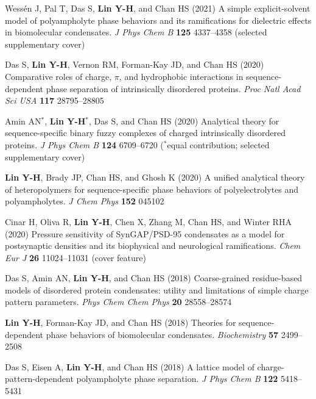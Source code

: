 \documentclass[11pt]{../yhlcv}
\def\tname#1{{\bf #1}}
\begin{document}
\begin{etaremune}[leftmargin=0.26in]

\item 
Wessén J, Pal T, Das S, \tname{Lin Y-H}, and Chan HS (2021)
A simple explicit-solvent model of polyampholyte phase behaviors and its ramifications for dielectric effects in biomolecular condensates.
{\it J Phys Chem B} {\bf 125} 4337--4358 (selected supplementary cover)

\item 
Das S, \tname{Lin Y-H}, Vernon RM, Forman-Kay JD, and Chan HS (2020)
Comparative roles of charge, $\pi$, and hydrophobic interactions in sequence-dependent phase separation of intrinsically disordered proteins.
{\it Proc Natl Acad Sci USA} {\bf 117} 28795--28805

\item 
Amin AN$^*$, \tname{Lin Y-H}$^*$, Das S, and Chan HS (2020)
Analytical theory for sequence-specific binary fuzzy complexes of charged intrinsically disordered proteins.
{\it J Phys Chem B} 
{\bf 124} 6709--6720
($^*$equal contribution; selected supplementary cover) 

\item
\tname{Lin Y-H}, Brady JP, Chan HS, and Ghosh K (2020)
A unified analytical theory of heteropolymers for sequence-specific phase behaviors of polyelectrolytes and polyampholytes. 
{\it J Chem Phys} {\bf 152} 045102

\item
Cinar H, Oliva R, \tname{Lin Y-H}, Chen X, Zhang M, Chan HS, and Winter RHA (2020)
Pressure sensitivity of SynGAP/PSD-95 condensates as a model for postsynaptic densities and its biophysical and neurological ramifications. 
{\it Chem Eur J} {\bf 26} 11024--11031 (cover feature) 

\item 
Das S, Amin AN, \tname{Lin Y-H}, and Chan HS (2018)
Coarse-grained residue-based models of disordered protein condensates: 
utility and limitations of simple charge pattern parameters.
{\it Phys Chem Chem Phys} {\bf 20} 28558--28574 

\item
\tname{Lin Y-H}, Forman-Kay JD, and Chan HS (2018)
Theories for sequence-dependent phase behaviors of biomolecular condensates.
{\it Biochemistry} {\bf 57} 2499--2508

\item 
Das S, Eisen A, \tname{Lin Y-H}, and Chan HS (2018)
A lattice model of charge-pattern-dependent polyampholyte phase separation.
{\it J Phys Chem B} {\bf 122} 5418--5431


\end{etaremune}
\end{document}
